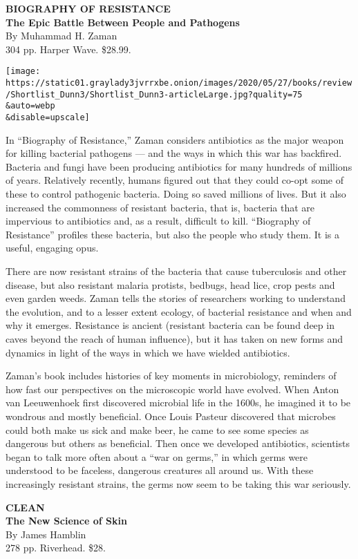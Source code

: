 \textbf{BIOGRAPHY OF RESISTANCE}\\
\textbf{The Epic Battle Between People and Pathogens}\\
By Muhammad H. Zaman\\
304 pp. Harper Wave. \$28.99.

\texttt{[image: https://static01.graylady3jvrrxbe.onion/images/2020/05/27/books/review/Shortlist\_Dunn3/Shortlist\_Dunn3-articleLarge.jpg?quality=75\\\&auto=webp\\\&disable=upscale]}

In ``Biography of Resistance,'' Zaman considers antibiotics as the major
weapon for killing bacterial pathogens --- and the ways in which this
war has backfired. Bacteria and fungi have been producing antibiotics
for many hundreds of millions of years. Relatively recently, humans
figured out that they could co-opt some of these to control pathogenic
bacteria. Doing so saved millions of lives. But it also increased the
commonness of resistant bacteria, that is, bacteria that are impervious
to antibiotics and, as a result, difficult to kill. ``Biography of
Resistance'' profiles these bacteria, but also the people who study
them. It is a useful, engaging opus.

There are now resistant strains of the bacteria that cause tuberculosis
and other disease, but also resistant malaria protists, bedbugs, head
lice, crop pests and even garden weeds. Zaman tells the stories of
researchers working to understand the evolution, and to a lesser extent
ecology, of bacterial resistance and when and why it emerges. Resistance
is ancient (resistant bacteria can be found deep in caves beyond the
reach of human influence), but it has taken on new forms and dynamics in
light of the ways in which we have wielded antibiotics.

Zaman's book includes histories of key moments in microbiology,
reminders of how fast our perspectives on the microscopic world have
evolved. When Anton van Leeuwenhoek first discovered microbial life in
the 1600s, he imagined it to be wondrous and mostly beneficial. Once
Louis Pasteur discovered that microbes could both make us sick and make
beer, he came to see some species as dangerous but others as beneficial.
Then once we developed antibiotics, scientists began to talk more often
about a ``war on germs,'' in which germs were understood to be faceless,
dangerous creatures all around us. With these increasingly resistant
strains, the germs now seem to be taking this war seriously.

\textbf{CLEAN}\\
\textbf{The New Science of Skin}\\
By James Hamblin\\
278 pp. Riverhead. \$28.

